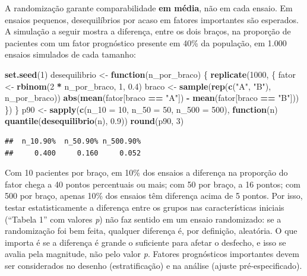\documentclass[
]{book}
\newenvironment{Shaded}{\begin{snugshade}}{\end{snugshade}}
\newcommand{\AttributeTok}[1]{\textcolor[rgb]{0.13,0.29,0.53}{#1}}
\newcommand{\ControlFlowTok}[1]{\textcolor[rgb]{0.13,0.29,0.53}{\textbf{#1}}}
\newcommand{\DecValTok}[1]{\textcolor[rgb]{0.00,0.00,0.81}{#1}}
\newcommand{\FloatTok}[1]{\textcolor[rgb]{0.00,0.00,0.81}{#1}}
\newcommand{\FunctionTok}[1]{\textcolor[rgb]{0.13,0.29,0.53}{\textbf{#1}}}
\newcommand{\NormalTok}[1]{#1}
\newcommand{\OtherTok}[1]{\textcolor[rgb]{0.56,0.35,0.01}{#1}}
\newcommand{\SpecialCharTok}[1]{\textcolor[rgb]{0.81,0.36,0.00}{\textbf{#1}}}
\newcommand{\StringTok}[1]{\textcolor[rgb]{0.31,0.60,0.02}{#1}}
\begin{document}
A randomização garante comparabilidade \textbf{em média}, não em cada ensaio. Em ensaios pequenos, desequilíbrios por acaso em fatores importantes são esperados. A simulação a seguir mostra a diferença, entre os dois braços, na proporção de pacientes com um fator prognóstico presente em 40\% da população, em 1.000 ensaios simulados de cada tamanho:

\begin{Shaded}
\begin{Highlighting}[]
\FunctionTok{set.seed}\NormalTok{(}\DecValTok{1}\NormalTok{)}
\NormalTok{desequilibrio }\OtherTok{\textless{}{-}} \ControlFlowTok{function}\NormalTok{(n\_por\_braco) \{}
  \FunctionTok{replicate}\NormalTok{(}\DecValTok{1000}\NormalTok{, \{}
\NormalTok{    fator }\OtherTok{\textless{}{-}} \FunctionTok{rbinom}\NormalTok{(}\DecValTok{2} \SpecialCharTok{*}\NormalTok{ n\_por\_braco, }\DecValTok{1}\NormalTok{, }\FloatTok{0.4}\NormalTok{)}
\NormalTok{    braco }\OtherTok{\textless{}{-}} \FunctionTok{sample}\NormalTok{(}\FunctionTok{rep}\NormalTok{(}\FunctionTok{c}\NormalTok{(}\StringTok{"A"}\NormalTok{, }\StringTok{"B"}\NormalTok{), n\_por\_braco))}
    \FunctionTok{abs}\NormalTok{(}\FunctionTok{mean}\NormalTok{(fator[braco }\SpecialCharTok{==} \StringTok{"A"}\NormalTok{]) }\SpecialCharTok{{-}} \FunctionTok{mean}\NormalTok{(fator[braco }\SpecialCharTok{==} \StringTok{"B"}\NormalTok{]))}
\NormalTok{  \})}
\NormalTok{\}}
\NormalTok{p90 }\OtherTok{\textless{}{-}} \FunctionTok{sapply}\NormalTok{(}\FunctionTok{c}\NormalTok{(}\AttributeTok{n\_10 =} \DecValTok{10}\NormalTok{, }\AttributeTok{n\_50 =} \DecValTok{50}\NormalTok{, }\AttributeTok{n\_500 =} \DecValTok{500}\NormalTok{),}
              \ControlFlowTok{function}\NormalTok{(n) }\FunctionTok{quantile}\NormalTok{(}\FunctionTok{desequilibrio}\NormalTok{(n), }\FloatTok{0.9}\NormalTok{))}
\FunctionTok{round}\NormalTok{(p90, }\DecValTok{3}\NormalTok{)}
\end{Highlighting}
\end{Shaded}

\begin{verbatim}
##  n_10.90%  n_50.90% n_500.90% 
##     0.400     0.160     0.052
\end{verbatim}

Com 10 pacientes por braço, em 10\% dos ensaios a diferença na proporção do fator chega a 40 pontos percentuais ou mais; com 50 por braço, a 16 pontos; com 500 por braço, apenas 10\% dos ensaios têm diferença acima de 5 pontos. Por isso, testar estatisticamente a diferença entre os grupos nas características iniciais (``Tabela 1'' com valores \emph{p}) não faz sentido em um ensaio randomizado: se a randomização foi bem feita, qualquer diferença é, por definição, aleatória. O que importa é se a diferença é grande o suficiente para afetar o desfecho, e isso se avalia pela magnitude, não pelo valor \emph{p}. Fatores prognósticos importantes devem ser considerados no desenho (estratificação) e na análise (ajuste pré-especificado).
\end{document}
